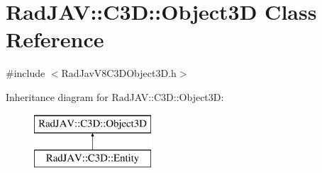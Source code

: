 \hypertarget{class_rad_j_a_v_1_1_c3_d_1_1_object3_d}{}\section{Rad\+J\+AV\+:\+:C3D\+:\+:Object3D Class Reference}
\label{class_rad_j_a_v_1_1_c3_d_1_1_object3_d}


{\ttfamily \#include $<$Rad\+Jav\+V8\+C3\+D\+Object3\+D.\+h$>$}

Inheritance diagram for Rad\+J\+AV\+:\+:C3D\+:\+:Object3D\+:\begin{figure}[H]
\begin{center}
\leavevmode
\includegraphics[height=2.000000cm]{class_rad_j_a_v_1_1_c3_d_1_1_object3_d}
\end{center}
\end{figure}
